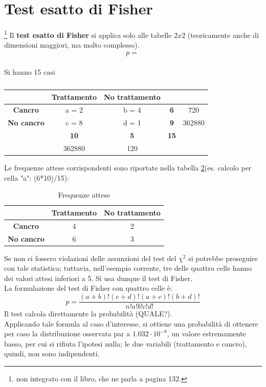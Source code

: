 \documentclass[10pt, draft]{book}
\newcounter{example}[section]
\begin{document}
\section{Test esatto di Fisher}\label{secfisher}\footnote{non integrato con il libro, che ne parla a pagina 132.}
Il \textbf{test esatto di Fisher} si applica solo alle tabelle $2x2$ (teoricamente anche di dimensioni maggiori, ma molto complesso).
\begin{equation}
    p = \frac{}{}
\end{equation}
\begin{example}[cancro]\label{escancro}
    Si hanno 15 casi
    \begin{table}[H]
        \centering
        \renewcommand\arraystretch{1.2}
        \begin{tabular}{c|c|c|c|c}
        \hline
         & \textbf{Trattamento} & \textbf{No trattamento}\\
        \hline
        \textbf{Cancro} & a = 2 & b = 4 & \textbf{6} & 720 \\
        \hline
        \textbf{No cancro} & c = 8 & d = 1 & \textbf{9} & 362880\\
        \hline
        & \textbf{10} & \textbf{5} & \textbf{15} & \\
        \hline
        & 362880 & 120 &  & \\
        \hline
        \end{tabular}
        \caption{}
        \label{tabcancro}
    \end{table}\noindent
    Le frequenze attese corrispondenti sono riportate nella tabella \ref{tabcancro2}(es. calcolo per cella "a": (6*10)/15):
    \begin{table}[H]
        \centering
        \renewcommand\arraystretch{1.2}
        \begin{tabular}{c|c|c}
        \hline
        & \textbf{Trattamento} & \textbf{No trattamento}\\
        \hline
        \textbf{Cancro} & 4 & 2\\
        \hline
        \textbf{No cancro} & 6 & 3\\
        \hline
        \end{tabular}
        \caption{\small{Frequenze attese }}
        \label{tabcancro2}
    \end{table}\noindent
    Se non ci fossero violazioni delle assunzioni del test del $\chi^2$ si potrebbe proseguire con tale statistica; tuttavia, nell'esempio corrente, tre delle quattro celle hanno dei valori attesi inferiori a 5. Si usa dunque il test di Fisher.
    \\
    La formulazione del test di Fisher con quattro celle è:
    \begin{equation}
        p = \frac{(a+b)!(c+d)!(a+c)!(b+d)!}{n!a!b!c!d!}
    \end{equation}
    Il test calcola direttamente la probabilità \colorbox{lyellow}{(QUALE?)}.
    \\
    Applicando tale formula al caso d'interesse, si ottiene una probabilità di ottenere per caso la distribuzione osservata par a $1.032 \cdot 10^{-8}$, un valore estremamente basso, per cui si rifiuta l'ipotesi nulla; le due variabili (trattamento e cancro), quindi, non sono indipendenti.
\end{example}
\end{document}

